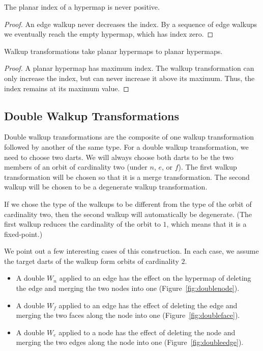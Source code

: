 \begin{lemma}  The planar index
of a hypermap is never positive.
\end{lemma}

\begin{proof}  An edge walkup never decreases the index.  By a sequence
of edge walkups we eventually reach the empty hypermap, which has
index zero.
\end{proof}


\begin{lemma} Walkup transformations take planar hypermaps to planar
hypermaps.
\end{lemma}

\begin{proof}  
A planar hypermap has maximum index.  The walkup
transformation can only increase the index, but can never increase
it above its maximum.  Thus, the index remains at its maximum value.
\end{proof}


\subsection{Double Walkup Transformations}

Double walkup transformations are the composite of one walkup
transformation followed by another of the same type.  For a double
walkup transformation, we need to choose two darts.  We will always
choose both darts to be the two members of an orbit of cardinality
two (under $n$, $e$, or $f$).  The first walkup transformation will be
chosen so that it is a merge transformation.  The second walkup will
be chosen to be a degenerate walkup transformation.

If we chose the type of the walkups to be different from the type of
the orbit of cardinality two, then the second walkup will
automatically be degenerate.  (The first walkup reduces the
cardinality of the orbit to $1$, which means that it is a
fixed-point.)

We point out a few interesting cases of this construction. In each
case, we assume the target darts of the walkup form orbits of
cardinality $2$.
\begin{itemize}
    \item A double $W_n$ applied to an edge has the effect on
    the hypermap of deleting the edge and merging the two nodes into
    one (Figure~\ref{fig:doublenode}). 
    \item A double $W_f$ applied to an edge has the effect of
    deleting the edge and merging the two faces along the node into
    one (Figure~\ref{fig:doubleface}).
    \item A double $W_e$ applied to a node has the effect of
    deleting the node and merging the two edges along the node into
    one (Figure~\ref{fig:doubleedge}).
\end{itemize}



